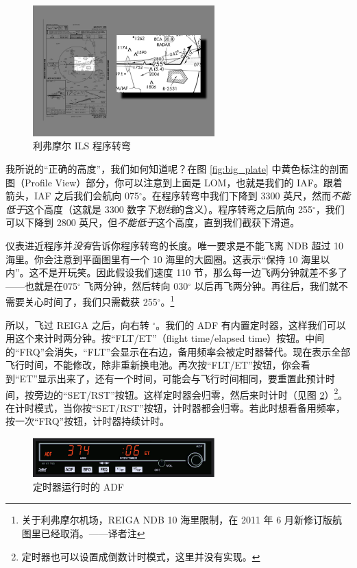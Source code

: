 \begin{figure}
  \begin{center}
    \includegraphics[width=7cm]{img/PT}
    \caption{利弗摩尔 ILS 程序转弯}
    \label{fig:PT}
  \end{center}
\end{figure}

我所说的“正确的高度”，我们如何知道呢？在图 \ref{fig:big_plate} 中黄色标注的剖面图（Profile View）部分，你可以注意到上面是 LOM，也就是我们的 IAF。跟着箭头，IAF 之后我们会航向 075$^\circ$。在程序转弯中我们下降到 3300 英尺，然而\emph{不能低于}这个高度（这就是 3300 数字\emph{下划线}的含义）。程序转弯之后航向 255$^\circ$，我们可以下降到 2800 英尺，但\emph{不能低于}这个高度，直到我们截获下滑道。

仪表进近程序并\emph{没有}告诉你程序转弯的长度。唯一要求是不能飞离 NDB 超过 10 海里。你会注意到平面图里有一个 10 海里的大圆圈。这表示“保持 10 海里以内”。这不是开玩笑。因此假设我们速度 110 节，那么每一边飞两分钟就差不多了——也就是在075$^\circ$ 飞两分钟，然后转向 030$^\circ$ 以后再飞两分钟。再往后，我们就不需要关心时间了，我们只需截获 255$^\circ$。\footnote{关于利弗摩尔机场，REIGA NDB 10 海里限制，在 2011 年 6 月新修订版航图里已经取消。——译者注}

所以，飞过 REIGA 之后，向右转 $^\circ$。我们的 ADF 有内置定时器，这样我们可以用这个来计时两分钟。按“FLT/ET”（flight time/elapsed time）按钮。中间的“FRQ”会消失，“FLT”会显示在右边，备用频率会被定时器替代。现在表示全部飞行时间，不能修改，除非重新换电池。再次按“FLT/ET”按钮，你会看到“ET”显示出来了，还有一个时间，可能会与飞行时间相同，要重置此预计时间，按旁边的“SET/RST”按钮。这样定时器会归零，然后来时计时（见图 \ref{fig:ADF}）\footnote{定时器也可以设置成倒数计时模式，这里并没有实现。}。在计时模式，当你按“SET/RST”按钮，计时器都会归零。若此时想看备用频率，按一次“FRQ”按钮，计时器持续计时。

\begin{figure}
  \begin{center}
    \includegraphics[width=7cm]{img/ADF}
    \caption{定时器运行时的 ADF}
    \label{fig:ADF}
  \end{center}
\end{figure}

